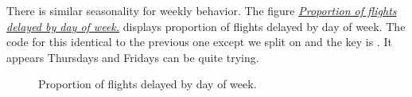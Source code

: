 \documentclass[letterpaper,10pt,english]{sphinxmanual}
\begin{document}
There is similar seasonality for weekly behavior. The figure \hyperref[airline:delay-by-day-of-week]{\emph{Proportion of flights delayed by day of week.}} displays proportion of
flights delayed by day of week. The code for this identical to the previous one
except we split on  and the key is . It appears
Thursdays and Fridays can be quite trying.
\label{airline:delay-by-day-of-week}\begin{figure}[htbp]
\centering

\caption{Proportion of flights delayed by day of week.}\end{figure}
\end{document}
